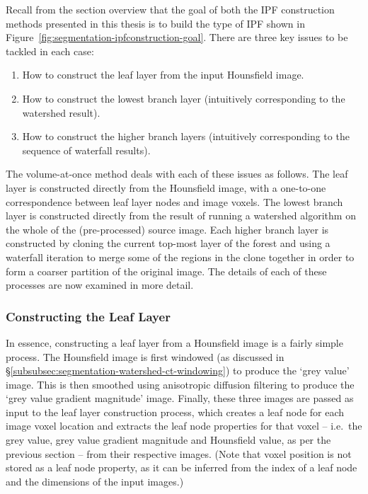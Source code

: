 Recall from the section overview that the goal of both the IPF construction methods presented in this thesis is to build the type of IPF shown in Figure~\ref{fig:segmentation-ipfconstruction-goal}. There are three key issues to be tackled in each case:
%
\begin{enumerate}
\item How to construct the leaf layer from the input Hounsfield image.
\item How to construct the lowest branch layer (intuitively corresponding to the watershed result).
\item How to construct the higher branch layers (intuitively corresponding to the sequence of waterfall results).
\end{enumerate}
%
The volume-at-once method deals with each of these issues as follows. The leaf layer is constructed directly from the Hounsfield image, with a one-to-one correspondence between leaf layer nodes and image voxels. The lowest branch layer is constructed directly from the result of running a watershed algorithm on the whole of the (pre-processed) source image. Each higher branch layer is constructed by cloning the current top-most layer of the forest and using a waterfall iteration to merge some of the regions in the clone together in order to form a coarser partition of the original image. The details of each of these processes are now examined in more detail.

\subsubsection{Constructing the Leaf Layer}

In essence, constructing a leaf layer from a Hounsfield image is a fairly simple process. The Hounsfield image is first windowed (as discussed in \S\ref{subsubsec:segmentation-watershed-ct-windowing}) to produce the `grey value' image. This is then smoothed using anisotropic diffusion filtering to produce the `grey value gradient magnitude' image. Finally, these three images are passed as input to the leaf layer construction process, which creates a leaf node for each image voxel location and extracts the leaf node properties for that voxel -- i.e.~the grey value, grey value gradient magnitude and Hounsfield value, as per the previous section -- from their respective images. (Note that voxel position is not stored as a leaf node property, as it can be inferred from the index of a leaf node and the dimensions of the input images.)

